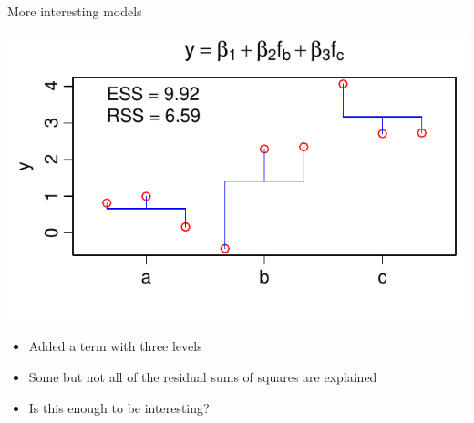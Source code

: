 \documentclass[xcolor=x11names,compress]{beamer}
\renewcommand{\(}{\begin{columns}}
\renewcommand{\)}{\end{columns}}
\newcommand{\<}[1]{\begin{column}{#1}}
\renewcommand{\>}{\end{column}}
\begin{document}
\begin{frame}{More interesting models}

    \centerline{\includegraphics[height=0.5\textheight]{Intermediate.pdf}}

    \begin{itemize}
    \item Added a term with three levels
    \item Some but not all of the residual sums of squares are explained
    \item Is this enough to be interesting?
    \end{itemize}		

\end{frame}
\end{document}

